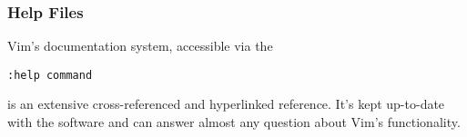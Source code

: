 \begin{frame}[fragile]
  \frametitle{Help Files}
  Vim's documentation system, accessible via the
  \vspace{0.5cm}
  \begin{center}
    \texttt{:help command}
  \end{center}
  \vspace{0.45cm}
  is an extensive cross-referenced and hyperlinked reference. It's kept
  up-to-date with the software and can answer almost any question about Vim's
  functionality.
\end{frame}
